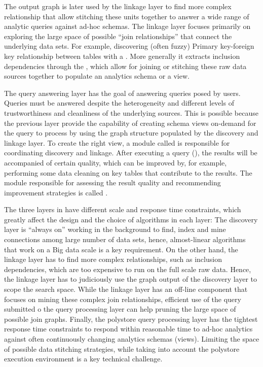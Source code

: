 The output graph is later used by the linkage layer to find more complex
relationship that allow stitching these units together to answer a wide range of
analytic queries against ad-hoc schemas. The linkage layer focuses primarily on
exploring the large space of possible ``join relationships'' that connect the
underlying data sets. For example, discovering (often fuzzy) Primary key-foreign
key relationship between tables with a . More
generally it extracts inclusion dependencies through the ,
which allow for joining or stitching these raw data sources together to populate
an analytics schema or a view. 

The query answering layer has the goal of answering queries posed by users.
Queries must be answered despite the heterogeneity and different levels of
trustworthiness and cleanliness of the underlying sources. This is possible
because the previous layer provide the capability of creating schema views
on-demand for the query to process by using the graph structure populated by
the discovery and linkage layer. To create the right view, a module
called  is responsible for coordinating discovery
and linkage. After executing a query (), the results will
be accompanied of certain quality, which can be improved by, for example,
performing some data cleaning on key tables that contribute to the results. The
module responsible for assessing the result quality and recommending improvement
strategies is called .

The three layers in \dcv have different scale and response time constraints,
which greatly affect the design and the choice of algorithms in each layer: The
discovery layer is ``always on'' working in the background to find, index and
mine connections among large number of data sets, hence, almost-linear
algorithms that work on a Big data scale is a key requirement. 
On the other hand, the linkage layer has to find more complex
relationships, such as inclusion dependencies, which are too expensive to run on
the full scale raw data. Hence, the linkage layer has to judiciously use the
graph output of the discovery layer to scope the search space. While the linkage
layer has an off-line component that focuses on mining these complex join
relationships, efficient use of the query submitted o the query processing layer
can help pruning the large space of possible join graphs. Finally, the polystore
query processing layer has the tightest response time constraints to respond
within reasonable time to ad-hoc analytics against often continuously changing
analytics schemas (views). Limiting the space of possible data stitching
strategies, while taking into account the polystore execution environment is a
key technical challenge. 

